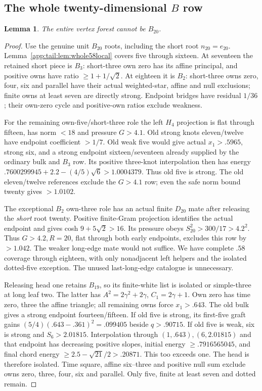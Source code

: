 \documentclass[11pt]{article}
\newtheorem{lemma}[theorem]{Lemma}
\theoremstyle{definition}
\theoremstyle{remark}
\begin{document}
\subsection{The whole twenty-dimensional $B$ row}
\begin{lemma}\label{app:tail:lem:wholeB20}
The entire vertex forest cannot be $B_{20}$.
\end{lemma}
\begin{proof}
Use the genuine unit $B_{20}$ roots, including the short root
$n_{20}=e_{20}$. Lemma~\ref{app:tail:lem:whole58local} covers
five through sixteen. At seventeen the retained short piece is
$B_3$: short-three own zero has its affine principal, and positive
owns have ratio $\ge1+1/\sqrt2$. At eighteen it is $B_2$:
short-three owns zero, four, six and parallel have their actual
weighted-star, affine and null exclusions; finite owns at least
seven are directly strong. Endpoint bridges have residual $1/36$;
their own-zero cycle and positive-own ratios exclude weakness.

For the remaining own-five/short-three role the left $H_4$
projection is flat through fifteen, has norm $<18$ and pressure
$G>4.1$. Old strong knots eleven/twelve have endpoint coefficient
$>1/7$. Old weak five would give actual $x_1>.5965$, strong six,
and a strong endpoint sixteen/seventeen already supplied by the
ordinary bulk and $B_3$ row. Its positive three-knot interpolation
then has energy
$.7600299945+2.2-(4/5)\sqrt6>1.0004379$.
Thus old five is strong. The old eleven/twelve references exclude
the $G>4.1$ row; even the safe norm bound twenty gives $>1.0102$.

The exceptional $B_2$ own-three role has an actual finite $D_{20}$
mate after releasing the \emph{short} root twenty. Positive
finite-Gram projection identifies the actual endpoint and gives
cosh $9+5\sqrt2>16$. Its pressure obeys
$S_{20}^2>300/17>4.2^2$. Thus $G>4.2,R=20$, flat through
both early endpoints, excludes this row by $>1.042$.
The weaker long-edge mate would not suffice.
We have complete $.58$ coverage through eighteen, with only
nonadjacent left helpers and the isolated dotted-five exception.
The unused last-long-edge catalogue is unnecessary.

Releasing head one retains $B_{19}$, so its finite-white list is
isolated or simple-three at long leaf two. The latter has
$A^2=2\gamma^2+2\gamma$, $C_1=2\gamma+1$.
Own zero has time zero, three the affine triangle; all remaining
owns force $x_1>.643$.
The old bulk gives a strong endpoint fourteen/fifteen. If old
five is strong, its first-five graft gains
$(5/4)(.643-.361)^2=.099405$ beside $q>.90715$.
If old five is weak, six is strong and $S_6>2.01815$.
Interpolation through $(1,.643),(6,2.01815)$ and that endpoint
has decreasing positive slopes, initial energy $\ge.7916565045$,
and final chord energy $\ge2.5-\sqrt{21}/2>.20871$.
This too exceeds one. The head is therefore isolated.
Time square, affine six--three and positive null sum exclude
owns zero, three, four, six and parallel. Only five, finite
at least seven and dotted remain.


\end{proof}
\end{document}
